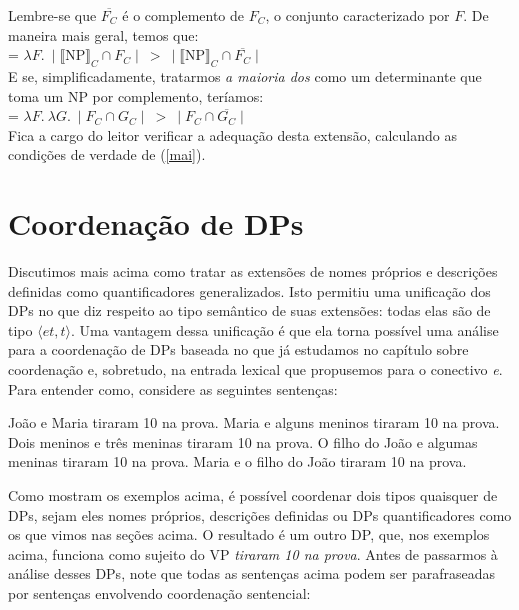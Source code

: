 \n Lembre-se que $\overline{F_{C}}$ é o complemento de $F_{C}$, o conjunto caracterizado por $F$. De maneira mais geral, temos que:\\

\n {} = $\lambda F.\ \mid \llbracket \text{NP} \rrbracket_{C}\cap F_{C}\mid\ >\ \mid \llbracket \text{NP} \rrbracket_{C}\cap \overline{F_{C}}\mid $\\

\n E se, simplificadamente, tratarmos \textit{a maioria dos} como um determinante que toma um NP por complemento, teríamos:\\

\n {} = $\lambda F.\ \lambda G.\ \mid F_{C}\cap G_{C}\mid\ >\ \mid F_{C}\cap \overline{G_{C}}\mid $\\

\n Fica a cargo do leitor verificar a adequação desta extensão,
calculando as condições de verdade de (\ref{mai}).


\section{Coordenação de DPs}

Discutimos mais acima como tratar as extensões de nomes próprios e
descrições definidas como quantificadores generalizados. Isto
permitiu uma unificação dos DPs no que diz respeito ao tipo
semântico de suas extensões: todas elas são de tipo $\langle
et,t\rangle$. Uma vantagem dessa unificação é que ela torna
possível uma análise para a coordenação de DPs baseada no que já
estudamos no capítulo sobre coordenação e, sobretudo, na entrada
lexical que propusemos para o conectivo \textit{e}. Para entender
como, considere as seguintes sentenças:

\begin{exe}
    \ex João e Maria tiraram 10 na prova. \label{de}
    \ex Maria e alguns meninos tiraram 10 na prova. \label{df}
    \ex Dois meninos e três meninas tiraram 10 na prova. \label{dg}
    \ex O filho do João e algumas meninas tiraram 10 na prova. \label{dh}
    \ex Maria e o filho do João tiraram 10 na prova. \label{di}
\end{exe}

\n Como mostram os exemplos acima, é possível coordenar dois tipos
quaisquer de DPs, sejam eles nomes próprios, descrições definidas
ou DPs quantificadores como os que vimos nas seções acima. O
resultado é um outro DP, que, nos exemplos acima, funciona como
sujeito do VP \textit{tiraram 10 na prova}. Antes de passarmos à
análise desses DPs, note que todas as sentenças acima podem ser
parafraseadas por sentenças envolvendo coordenação sentencial:

